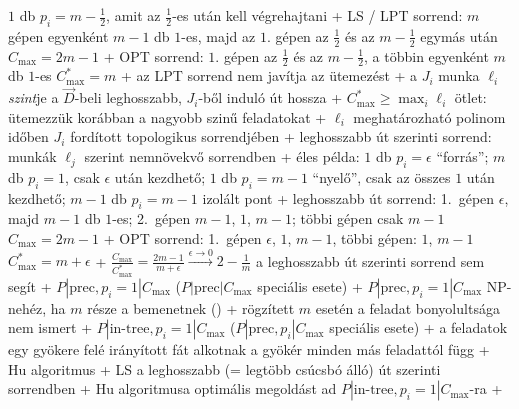     $1$ db $p_i = m - \frac{1}{2}$, amit az $\frac{1}{2}$-es után
    kell végrehajtani
    + LS / LPT sorrend: $m$ gépen egyenként $m - 1$ db $1$-es, majd az
      $1$. gépen az $\frac{1}{2}$ és az $m - \frac{1}{2}$ egymás után \RA%
      $C_{\max} = 2m - 1$
    + OPT sorrend: $1$. gépen az $\frac{1}{2}$ és az $m -
      \frac{1}{2}$, a többin egyenként $m$ db $1$-es \RA $C_{\max}^* =
      m$
    + az LPT sorrend nem javítja az ütemezést
  + \dfn a $J_i$ munka $\ell_i$ \emph{szint}je a $\vec{D}$-beli
    leghosszabb, $J_i$-ből induló út hossza
    + $C_{\max}^* \ge \max_i \ell_i$ \RA ötlet: ütemezzük korábban a
      nagyobb szinű feladatokat
    + $\ell_i$ meghatározható polinom időben $J_i$ fordított
      topologikus sorrendjében
  + leghosszabb út szerinti sorrend: munkák $\ell_j$ szerint
    nemnövekvő sorrendben
  + éles példa: $1$ db $p_i = \epsilon$ ``forrás''; $m$ db $p_i = 1$,
    csak $\epsilon$ után kezdhető; $1$ db $p_i = m - 1$ ``nyelő'', csak
    az összes $1$ után kezdhető; $m - 1$ db $p_i = m - 1$ izolált pont
    + leghosszabb út sorrend: 1.~gépen $\epsilon$, majd $m - 1$ db
      $1$-es; 2.~gépen $m - 1$, $1$, $m - 1$; többi gépen csak $m - 1$
      \RA $C_{\max} = 2m - 1$
    + OPT sorrend: 1.~gépen $\epsilon$, $1$, $m - 1$, többi gépen:
      $1$, $m - 1$ \RA $C_{\max}^* = m + \epsilon$
    + $\frac{C_{\max}}{C_{\max}^*} = \frac{2m - 1}{m + \epsilon}
      \xrightarrow{\epsilon \to 0} 2 - \frac{1}{m}$ \RA a leghosszabb
      út szerinti sorrend sem segít
+ \prob $P|\textrm{prec}, p_i = 1|C_{\max}$
  ($P|\textrm{prec}|C_{\max}$ speciális esete)
  + \thm $P|\textrm{prec}, p_i = 1|C_{\max}$ NP-nehéz, ha $m$ része a
    bemenetnek (\noproof)
  + rögzített $m$ esetén a feladat bonyolultsága nem ismert
+ \prob $P|\textrm{in-tree}, p_i = 1|C_{\max}$
  ($P|\textrm{prec}, p_i|C_{\max}$ speciális esete)
  + a feladatok egy gyökere felé irányított fát alkotnak \RA a gyökér
    minden más feladattól függ
  + \alg Hu algoritmus
    + LS a leghosszabb (= legtöbb csúcsbó álló) út szerinti sorrendben
    + \thm Hu algoritmusa optimális megoldást ad $P|\textrm{in-tree},
      p_i = 1|C_{\max}$-ra
      + \noproof